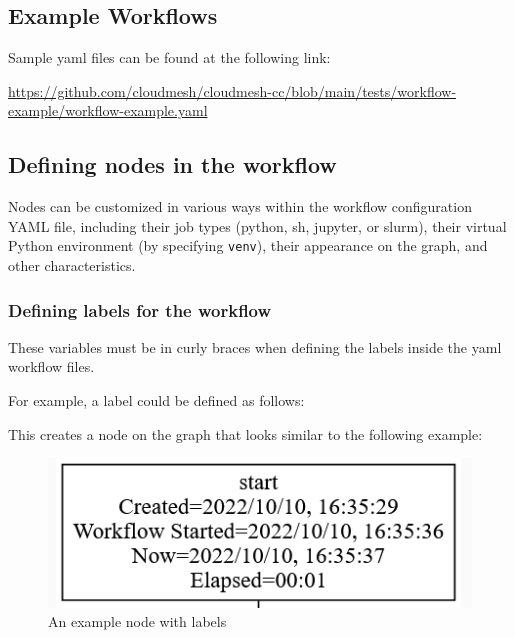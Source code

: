 \subsection{Example Workflows}\label{example-workflows}

Sample yaml files can be found at the following link:

\url{https://github.com/cloudmesh/cloudmesh-cc/blob/main/tests/workflow-example/workflow-example.yaml}

\subsection{Defining nodes in the
workflow}\label{defining-nodes-in-the-workflow}

Nodes can be customized in various ways within the workflow
configuration YAML file, including their job types (python, sh, jupyter,
or slurm), their virtual Python environment (by specifying
\texttt{venv}), their appearance on the graph, and other
characteristics.

\subsubsection{Defining labels for the
workflow}\label{defining-labels-for-the-workflow}

These variables must be in curly braces when defining the labels inside
the yaml workflow files.

For example, a label could be defined as follows:

\begin{Shaded}
\begin{Highlighting}[]
\end{Highlighting}
\end{Shaded}

This creates a node on the graph that looks similar to the following
example:

\begin{figure}
\centering
\includegraphics{images/labelmaker-example.png}
\caption{An example node with labels}
\end{figure}

